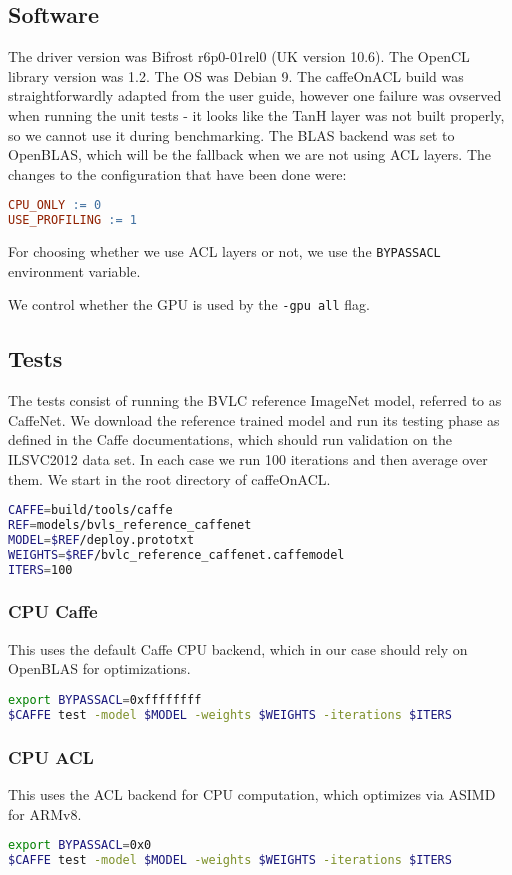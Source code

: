 \documentclass[12pt, a4paper, notitlepage]{report}
\begin{document}
\subsection*{Software}
The driver version was Bifrost r6p0-01rel0 (UK version 10.6).
The OpenCL library version was 1.2.
The OS was Debian 9.
The caffeOnACL build was straightforwardly adapted from the user guide, however one failure was ovserved when running the unit tests - it looks like the TanH layer was not built properly, so we cannot use it during benchmarking. The BLAS backend was set to OpenBLAS, which will be the fallback when we are not using ACL layers. The changes to the configuration that have been done were:
\begin{lstlisting}[language=make]
CPU_ONLY := 0
USE_PROFILING := 1
\end{lstlisting}

For choosing whether we use ACL layers or not, we use the \verb|BYPASSACL| environment variable.

We control whether the GPU is used by the \verb|-gpu all| flag.

\subsection*{Tests}
The tests consist of running the BVLC reference ImageNet model, referred to as CaffeNet. We download the reference trained model and run its testing phase as defined in the Caffe documentations, which should run validation on the ILSVC2012 data set. In each case we run 100 iterations and then average over them.
We start in the root directory of caffeOnACL.
\begin{lstlisting}[language=bash]
CAFFE=build/tools/caffe
REF=models/bvls_reference_caffenet
MODEL=$REF/deploy.prototxt
WEIGHTS=$REF/bvlc_reference_caffenet.caffemodel
ITERS=100
\end{lstlisting}
\subsubsection*{CPU Caffe}
This uses the default Caffe CPU backend, which in our case should rely on OpenBLAS for optimizations.
\begin{lstlisting}[language=bash]
export BYPASSACL=0xffffffff
$CAFFE test -model $MODEL -weights $WEIGHTS -iterations $ITERS
\end{lstlisting}

\subsubsection*{CPU ACL}
This uses the ACL backend for CPU computation, which optimizes via ASIMD for ARMv8.
\begin{lstlisting}[language=bash]
export BYPASSACL=0x0
$CAFFE test -model $MODEL -weights $WEIGHTS -iterations $ITERS
\end{lstlisting}
\end{document}
